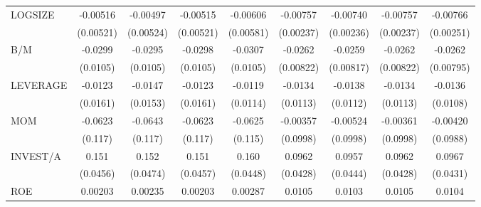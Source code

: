 \begin{table}[htbp]
\begin{tabular}{l*{8}{c}}
LOGSIZE             &    -0.00516         &    -0.00497         &    -0.00515         &    -0.00606         &    -0.00757\sym{***}&    -0.00740\sym{***}&    -0.00757\sym{***}&    -0.00766\sym{***}\\
                    &   (0.00521)         &   (0.00524)         &   (0.00521)         &   (0.00581)         &   (0.00237)         &   (0.00236)         &   (0.00237)         &   (0.00251)         \\
B/M                 &     -0.0299\sym{***}&     -0.0295\sym{***}&     -0.0298\sym{***}&     -0.0307\sym{***}&     -0.0262\sym{***}&     -0.0259\sym{***}&     -0.0262\sym{***}&     -0.0262\sym{***}\\
                    &    (0.0105)         &    (0.0105)         &    (0.0105)         &    (0.0105)         &   (0.00822)         &   (0.00817)         &   (0.00822)         &   (0.00795)         \\
LEVERAGE            &     -0.0123         &     -0.0147         &     -0.0123         &     -0.0119         &     -0.0134         &     -0.0138         &     -0.0134         &     -0.0136         \\
                    &    (0.0161)         &    (0.0153)         &    (0.0161)         &    (0.0114)         &    (0.0113)         &    (0.0112)         &    (0.0113)         &    (0.0108)         \\
MOM                 &     -0.0623         &     -0.0643         &     -0.0623         &     -0.0625         &    -0.00357         &    -0.00524         &    -0.00361         &    -0.00420         \\
                    &     (0.117)         &     (0.117)         &     (0.117)         &     (0.115)         &    (0.0998)         &    (0.0998)         &    (0.0998)         &    (0.0988)         \\
INVEST/A            &       0.151\sym{***}&       0.152\sym{***}&       0.151\sym{***}&       0.160\sym{***}&      0.0962\sym{**} &      0.0957\sym{**} &      0.0962\sym{**} &      0.0967\sym{**} \\
                    &    (0.0456)         &    (0.0474)         &    (0.0457)         &    (0.0448)         &    (0.0428)         &    (0.0444)         &    (0.0428)         &    (0.0431)         \\
ROE                 &     0.00203         &     0.00235         &     0.00203         &     0.00287         &      0.0105         &      0.0103         &      0.0105         &      0.0104         \\

\end{tabular}
\end{table}

